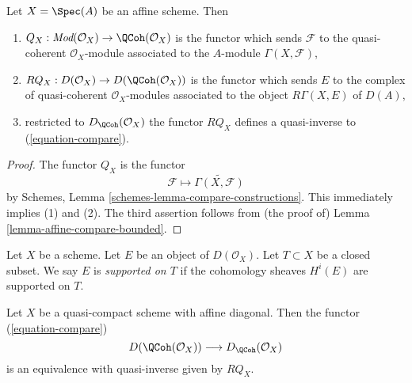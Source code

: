 \begin{lemma}
\label{lemma-affine-coherator}
Let $X = \Spec(A)$ be an affine scheme. Then
\begin{enumerate}
\item $Q_X : \textit{Mod}(\mathcal{O}_X) \to \QCoh(\mathcal{O}_X)$
is the functor
which sends $\mathcal{F}$ to the quasi-coherent $\mathcal{O}_X$-module
associated to the $A$-module $\Gamma(X, \mathcal{F})$,
\item $RQ_X : D(\mathcal{O}_X) \to D(\QCoh(\mathcal{O}_X))$
is the functor which sends $E$ to the complex of quasi-coherent
$\mathcal{O}_X$-modules associated to the object $R\Gamma(X, E)$ of $D(A)$,
\item restricted to $D_\QCoh(\mathcal{O}_X)$ the functor
$RQ_X$ defines a quasi-inverse to (\ref{equation-compare}).
\end{enumerate}
\end{lemma}

\begin{proof}
The functor $Q_X$ is the functor
$$
\mathcal{F} \mapsto \widetilde{\Gamma(X, \mathcal{F})}
$$
by Schemes, Lemma \ref{schemes-lemma-compare-constructions}.
This immediately implies (1) and (2). The third assertion
follows from (the proof of)
Lemma \ref{lemma-affine-compare-bounded}.
\end{proof}

\begin{definition}
\label{definition-supported-on}
Let $X$ be a scheme. Let $E$ be an object of $D(\mathcal{O}_X)$.
Let $T \subset X$ be a closed subset.
We say $E$ is {\it supported on $T$} if the
cohomology sheaves $H^i(E)$ are supported on $T$.
\end{definition}

\begin{proposition}
\label{proposition-quasi-compact-affine-diagonal}
Let $X$ be a quasi-compact scheme with affine diagonal.
Then the functor (\ref{equation-compare})
$$
D(\QCoh(\mathcal{O}_X))
\longrightarrow
D_\QCoh(\mathcal{O}_X)
$$
is an equivalence with quasi-inverse given by $RQ_X$.
\end{proposition}


